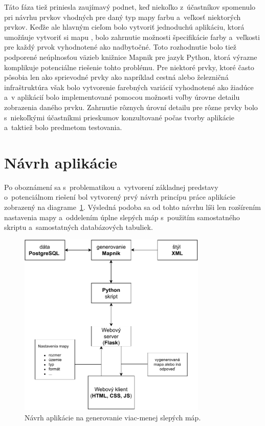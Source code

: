 Táto fáza tiež priniesla zaujímavý podnet, keď niekoľko z~účastníkov spomenulo pri návrhu prvkov vhodných pre daný typ mapy farbu a~veľkosť niektorých prvkov. Keďže ale hlavným cieľom bolo vytvoriť jednoduchú aplikáciu, ktorá umožňuje vytvoriť si mapu , bolo zahrnutie možnosti špecifikácie farby a~veľkosti pre každý prvok vyhodnotené ako nadbytočné. Toto rozhodnutie bolo tiež podporené neúplnosťou väzieb knižnice Mapnik pre jazyk Python, ktorá výrazne komplikuje potenciálne riešenie tohto problému. Pre niektoré prvky, ktoré často pôsobia len ako sprievodné prvky ako napríklad cestná alebo železničná infraštruktúra však bolo vytvorenie farebných variácií vyhodnotené ako žiadúce a~v aplikácií bolo implementované pomocou možnosti voľby úrovne detailu zobrazenia daného prvku. Zahrnutie rôznych úrovní detailu pre rôzne prvky bolo s~niekoľkými účastníkmi prieskumov konzultované počas tvorby aplikácie a~taktiež bolo predmetom testovania.


\section{Návrh aplikácie}
Po oboznámení sa s~problematikou a~vytvorení základnej predstavy o~potenciálnom riešení bol vytvorený prvý návrh princípu práce aplikácie zobrazený na diagrame~\ref{graph_app_prototype}. Výsledná podoba sa od tohto návrhu líši len rozšírením nastavenia mapy a~oddelením úplne slepých máp s~použitím samostatného skriptu a~samostatných databázových tabuliek.

\begin{figure}[hbt]
	\centering
	\includegraphics[width=0.8\textwidth]{obrazky-figures/prototype_app.pdf}
	\caption{Návrh aplikácie na generovanie viac-menej slepých máp.}
	\label{graph_app_prototype}
\end{figure}

